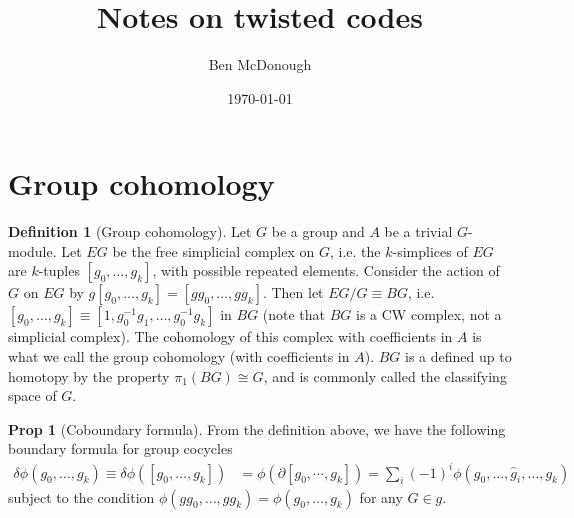 \documentclass{article}
\title{Notes on twisted codes}
\date{\today}
\author{Ben McDonough}
\theoremstyle{definition}
\newtheorem{defn}{Definition}
\theoremstyle{definition}
\newtheorem{prop}{Prop}
\begin{document}
\maketitle

\tableofcontents

\section{Group cohomology}

\begin{defn}[Group cohomology]
Let $G$ be a group and $A$ be a trivial $G$-module. Let $EG$ be the free
simplicial complex on $G$, i.e. the $k$-simplices of $EG$ are $k$-tuples $[g_0,
\ldots, g_k]$, with possible repeated elements. Consider the action of $G$ on
$EG$ by $g[g_0, \ldots, g_k] = [gg_0, \ldots, gg_k]$. Then let $EG/G \equiv BG$,
i.e. $[g_0, \ldots, g_k] \equiv [1,g_0^{-1}g_1, \ldots, g_0^{-1}g_k]$ in $BG$
(note that $BG$ is a CW complex, not a simplicial complex).  The cohomology of
this complex with coefficients in $A$ is what we call the group cohomology (with
coefficients in $A$). $BG$ is a defined up to homotopy by the property
$\pi_1(BG) \cong G$, and is commonly called the classifying space of $G$.
\end{defn}

\begin{prop}[Coboundary formula]\label{prop:group-coboundary-formula}
From the definition above, we have the following boundary formula for group cocycles
\begin{align}
\delta \phi(g_0, \dots, g_k) \equiv \delta \phi([g_0, \dots, g_k]) &=  \phi(\partial[g_0, \cdots, g_k])
 = \sum_{i}(-1)^i\phi(g_0, \dots, \widehat g_i, \dots, g_k)
\end{align}
subject to the condition $\phi(gg_0, \dots, gg_k) = \phi(g_0, \dots, g_k)$ for any $G \in g$.
\end{prop}
\end{document}
